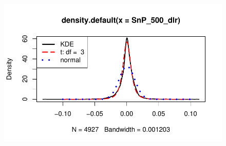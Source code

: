 \documentclass[
  letterpaper,
  DIV=11,
  numbers=noendperiod]{scrartcl}
\begin{document}
\begin{figure}[H]

{\centering \includegraphics{homework_1_files/figure-pdf/unnamed-chunk-19-1.pdf}

}

\end{figure}
\end{document}
